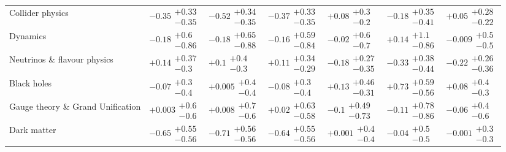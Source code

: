 \begin{table}[H]
\begin{tabular}{lllllll}
Collider physics & $\bm{-0.35}\substack{+0.33 \\ -0.35}$ & $\bm{-0.52}\substack{+0.34 \\ -0.35}$ & $\bm{-0.37}\substack{+0.33 \\ -0.35}$ & $+0.08\substack{+0.3 \\ -0.2}$ & $-0.18\substack{+0.35 \\ -0.41}$ & $+0.05\substack{+0.28 \\ -0.22}$ \\
Dynamics & $-0.18\substack{+0.6 \\ -0.86}$ & $-0.18\substack{+0.65 \\ -0.88}$ & $-0.16\substack{+0.59 \\ -0.84}$ & $-0.02\substack{+0.6 \\ -0.7}$ & $+0.14\substack{+1.1 \\ -0.86}$ & $-0.009\substack{+0.5 \\ -0.5}$ \\
Neutrinos \& flavour physics & $+0.14\substack{+0.37 \\ -0.3}$ & $+0.1\substack{+0.4 \\ -0.3}$ & $+0.11\substack{+0.34 \\ -0.29}$ & $-0.18\substack{+0.27 \\ -0.35}$ & $-0.33\substack{+0.38 \\ -0.44}$ & $-0.22\substack{+0.26 \\ -0.36}$ \\
Black holes & $-0.07\substack{+0.3 \\ -0.4}$ & $+0.005\substack{+0.4 \\ -0.4}$ & $-0.08\substack{+0.3 \\ -0.4}$ & $+0.13\substack{+0.46 \\ -0.31}$ & $\bm{+0.73}\substack{+0.59 \\ -0.56}$ & $+0.08\substack{+0.4 \\ -0.3}$ \\
Gauge theory \& Grand Unification & $+0.003\substack{+0.6 \\ -0.6}$ & $+0.008\substack{+0.7 \\ -0.6}$ & $+0.02\substack{+0.63 \\ -0.58}$ & $-0.1\substack{+0.49 \\ -0.73}$ & $-0.11\substack{+0.78 \\ -0.86}$ & $-0.06\substack{+0.4 \\ -0.6}$ \\
Dark matter & $\bm{-0.65}\substack{+0.55 \\ -0.56}$ & $\bm{-0.71}\substack{+0.56 \\ -0.56}$ & $\bm{-0.64}\substack{+0.55 \\ -0.56}$ & $+0.001\substack{+0.4 \\ -0.4}$ & $-0.04\substack{+0.5 \\ -0.5}$ & $-0.001\substack{+0.3 \\ -0.3}$ \\

\end{tabular}
\end{table}
